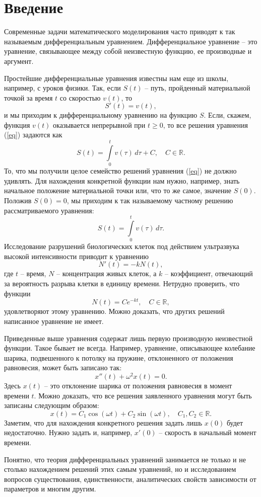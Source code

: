 \documentclass[a4paper,14pt]{extarticle}
\newcommand{\be}{\begin{equation}}
\newcommand{\ee}{\end{equation}}
\newcommand{\la}{\label}
\begin{document}
\tableofcontents
\newpage

\section{Введение}
Современные задачи математического моделирования часто приводят к так называемым дифференциальным уравнением. Дифференциальное уравнение -- это уравнение, связывающее между собой неизвестную функцию, ее производные и аргумент. 

Простейшие дифференциальные уравнения известны нам еще из школы, например, с уроков физики. Так, если $S(t)$ -- путь, пройденный материальной точкой за время $t$ со скоростью $v(t)$, то 
\be\la{eq}
S'(t) = v(t),
\ee
и мы приходим к дифференциальному уравнению на функцию $S$. Если, скажем, функция $v(t)$ оказывается непрерывной при $t \geq 0$, то все решения уравнения (\ref{eq}) задаются как
$$
S(t) = \int\limits_0^t v(\tau) \, d\tau + C, \quad C \in \mathbb R.
$$
То, что мы получили целое семейство решений уравнения (\ref{eq}) не должно удивлять. Для нахождения конкретной функции нам нужно, например, знать начальное положение материальной точки или, что то же самое, значение $S(0)$. Положив $S(0)= 0$, мы приходим к так называемому частному решению рассматриваемого уравнения:
$$
S(t) = \int\limits_0^t v(\tau) \, d\tau.
$$
Исследование разрушений биологических клеток под действием ультразвука высокой интенсивности приводит к уравнению
$$
N'(t) = -kN(t),
$$
где $t$ -- время, $N$ -- концентрация живых клеток, а $k$ -- коэффициент, отвечающий за вероятность разрыва клетки в единицу времени. Нетрудно проверить, что функции
$$
N(t) = Ce^{-kt}, \quad C \in \mathbb R,
$$
удовлетворяют этому уравнению. Можно доказать, что других решений написанное уравнение не имеет. 

Приведенные выше уравнения содержат лишь первую производную неизвестной функции. Такое бывает не всегда. Например, уравнение, описывающее колебание шарика, подвешенного к потолку на пружине, отклоненного от положения равновесия, может быть записано так:
$$
x''(t) + \omega^2 x(t) = 0.
$$
Здесь $x(t)$ -- это отклонение шарика от положения равновесия в момент времени $t$. Можно доказать, что все решения заявленного уравнения могут быть записаны следующим образом:
$$
x(t) = C_1\cos (\omega t) + C_2 \sin (\omega t), \quad C_1, C_2 \in \mathbb R.
$$
Заметим, что для нахождения конкретного решения задать лишь $x(0)$ будет недостаточно. Нужно задать и, например, $x'(0)$ -- скорость в начальный момент времени. 

Понятно, что теория дифференциальных уравнений занимается не только и не столько нахождением решений этих самым уравнений, но и исследованием вопросов существования, единственности, аналитических свойств зависимости от параметров и многим другим. 
\end{document}

